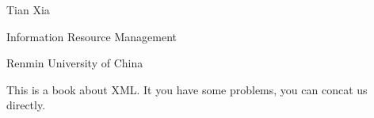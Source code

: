 \noindent Tian Xia\par
\noindent Information Resource Management\par
\noindent Renmin University of China\par
\smallskip

This is a book about XML. It you have some problems, you can concat us directly.\par
\bye

